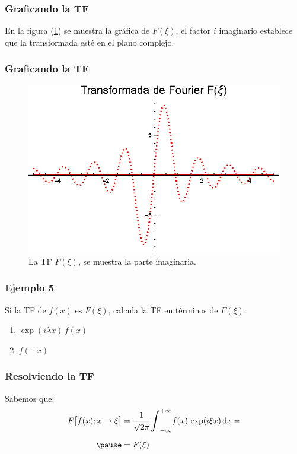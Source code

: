 \begin{frame}
\frametitle{Graficando la TF}
En la figura (\ref{fig:figura_plot_Ejemplo_04_02}) se muestra la gráfica de $F (\xi)$, el factor $i$ imaginario establece que la transformada esté en el plano complejo.
\end{frame}
\begin{frame}
\frametitle{Graficando la TF}
\begin{figure}[H]
    \centering
    \includegraphics[scale=1]{Imagenes/Plot_Ejemplo_04_02.eps}
    \caption{La TF $F (\xi)$, se muestra la parte imaginaria.}
    \label{fig:figura_plot_Ejemplo_04_02}
\end{figure}
\end{frame}
\begin{frame}
\frametitle{Ejemplo 5}
Si la TF de $f (x)$ es $F (\xi)$, calcula la TF en términos de $F (\xi)$:
\pause
{}
\begin{enumerate}[<+->]
\item $\exp(i \lambda x) \, f (x)$
\item $f (-x)$
\end{enumerate}
\end{frame}
\begin{frame}
\frametitle{Resolviendo la TF}  
Sabemos que:
\pause
\begin{eqnarray*}
\begin{aligned}
F \big[ f (x); x \to \xi \big] &= \dfrac{1}{\sqrt{2 \pi}} \scaleint{6ex}_{-\infty}^{+\infty} f (x) \, \exp(i \xi x) \dd{x} = \\[0.5em] \pause
&= F (\xi)
\end{aligned}
\end{eqnarray*}
\end{frame}
